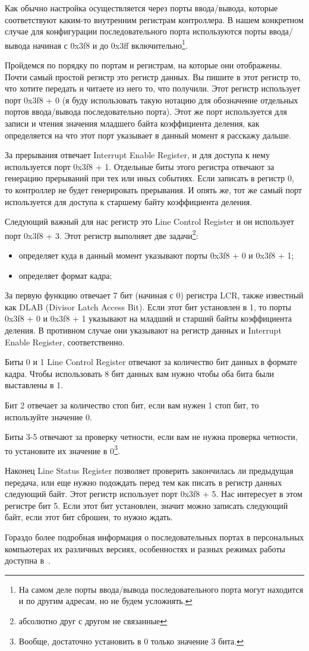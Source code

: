 Как обычно настройка осуществляется через порты ввода/вывода, которые
соответствуют каким-то внутренним регистрам контроллера. В нашем конкретном
случае для конфигурации последовательного порта используются порты ввода/вывода
начиная с 0x3f8 и до 0x3ff включительно\footnote{На самом деле порты
ввода/вывода последовательного порта могут находится и по другим адресам, но не
будем усложнять.}.

Пройдемся по порядку по портам и регистрам, на которые они отображены. Почти
самый простой регистр это регистр данных. Вы пишите в этот регистр то, что
хотите передать и читаете из него то, что получили. Этот регистр использует порт
0x3f8 + 0 (я буду использовать такую нотацию для обозначение отдельных портов
ввода/вывода последовательно порта). Этот же порт используется для записи и
чтения значения младшего байта коэффициента деления, как определяется на что
этот порт указывает в данный момент я расскажу дальше.

За прерывания отвечает Interrupt Enable Register, и для доступа к нему
используется порт 0x3f8 + 1. Отдельные биты этого регистра отвечают за
генерацию прерываний при тех или иных событиях. Если записать в регистр 0, то
контроллер не будет генерировать прерывания. И опять же, тот же самый порт
используется для доступа к старшему байту коэффициента деления.

Следующий важный для нас регистр это Line Control Register и он использует порт
0x3f8 + 3. Этот регистр выполняет две задачи\footnote{абсолютно друг с другом
не связанные}:
\begin{itemize}
  \item определяет куда в данный момент указывают порты 0x3f8 + 0 и 0x3f8 + 1;
  \item определяет формат кадра;
\end{itemize}

За первую функцию отвечает 7 бит (начиная с 0) регистра LCR, также известный как
DLAB (Divisor Latch Access Bit). Если этот бит установлен в 1, то порты
0x3f8 + 0 и 0x3f8 + 1 указывают на младший и старший байты коэффициента деления.
В противном случае они указывают на регистр данных и Interrupt Enable Register,
соответственно.

Биты 0 и 1 Line Control Register отвечают за количество бит данных в формате
кадра. Чтобы использовать 8 бит данных вам нужно чтобы оба бита были выставлены
в 1.

Бит 2 отвечает за количество стоп бит, если вам нужен 1 стоп бит, то используйте
значение 0.

Биты 3-5 отвечают за проверку четности, если вам не нужна проверка четности, то
установите их значение в 0\footnote{Вообще, достаточно установить в 0 только
значение 3 бита.}.

Наконец Line Status Register позволяет проверить закончилась ли предыдущая
передача, или еще нужно подождать перед тем как писать в регистр данных
следующий байт. Этот регистр использует порт 0x3f8 + 5. Нас интересует в этом
регистре бит 5. Если этот бит установлен, значит можно записать следующий байт,
если этот бит сброшен, то нужно ждать.

Гораздо более подробная информация о последовательных портах в персональных
компьютерах их различных версиях, особенностях и разных режимах работы доступна
в~\cite{SERIAL}.

